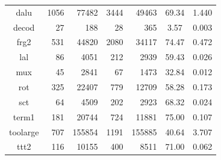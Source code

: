 \documentclass[conference]{IEEEtran}
\begin{document}
\begin{table}[hbt]
\begin{tabular}{crrrrcc}
    dalu            &       1056    &       77482   &       3444    &       49463   &  69.34      & 1.440 \\
    decod           &       27      &       188     &       28      &       365     &  3.57       & 0.003 \\
    frg2            &       531     &       44820   &       2080    &       34117   & 74.47       & 0.472 \\
    lal             &       86      &       4051    &       212     &       2939    &  59.43      & 0.026 \\ %
    mux             &       45      &       2841    &       67      &       1473    &   32.84     & 0.012 \\
    rot             &       325     &       22407   &       779     &       12709   & 58.28       & 0.173 \\ %
    sct             &       64      &       4509    &       202     &       2923    & 68.32       & 0.024 \\ %
    term1           &       181     &       20744   &       724     &       11881   & 75.00          & 0.107 \\ %
   toolarge       &       707     &       155854  &       1191    &       155885   &  40.64      & 3.707 \\
    ttt2            &       116     &       10155   &       400     &       8511    & 71.00          & 0.062 \\ %

\end{tabular}
\end{table}
\end{document}
